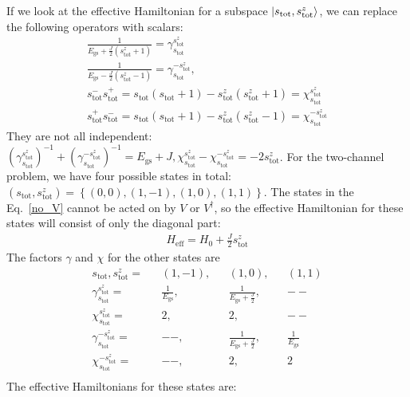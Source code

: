 \documentclass[12pt]{revtex4-2}
\begin{document}
If we look at the effective Hamiltonian for a subspace \(\ket{s_\text{tot}, s^z_\text{tot}}\), we can replace the following operators with scalars:
\begin{gather}
	\frac{1}{E_\text{gs} + \frac{J}{2} \left(s_\text{tot}^z + 1\right)} = \gamma_{s_\text{tot}}^{s_\text{tot}^z}\\
	\frac{1}{E_\text{gs} - \frac{J}{2} \left(s_\text{tot}^z - 1\right)} = \gamma_{s_\text{tot}}^{-s_\text{tot}^z},\\
	s_\text{tot}^- s_\text{tot}^+ = s_\text{tot}\left(s_\text{tot} + 1\right) - s^z_\text{tot}\left(s^z_\text{tot} + 1\right) = \chi_{s_\text{tot}}^{s_\text{tot}^z}\\
	s_\text{tot}^+ s_\text{tot}^- = s_\text{tot}\left(s_\text{tot} + 1\right) - s^z_\text{tot}\left(s^z_\text{tot} - 1\right) = \chi_{s_\text{tot}}^{-s_\text{tot}^z}
\end{gather}
They are not all independent: \(\left(\gamma_{s_\text{tot}}^{s_\text{tot}^z}\right)^{-1} + \left(\gamma_{s_\text{tot}}^{-s_\text{tot}^z}\right)^{-1} =  E_\text{gs} + J, \chi_{s_\text{tot}}^{s_\text{tot}^z} - \chi_{s_\text{tot}}^{-s_\text{tot}^z} = -2 s^z_\text{tot}\). 
For the two-channel problem, we have four possible states in total: \(\left( s_\text{tot}, s_\text{tot}^z \right) = \left\{ (0,0), (1,-1), (1,0), (1,1) \right\} \). The states in the Eq.~\ref{no_V} cannot be acted on by \(V\) or \(V^\dagger\), so the effective Hamiltonian for these states will consist of only the diagonal part:
\begin{align}
	H_\text{eff} = H_0 + \frac{J}{2}s^z_\text{tot}
\end{align}
The factors \(\gamma\) and \(\chi\) for the other states are
\begin{align}
	s_\text{tot}, s_\text{tot}^z = && (1,-1), && (1,0), && (1,1)\\
	\gamma_{s_\text{tot}}^{s_\text{tot}^z} = && \frac{1}{E_\text{gs}}, && \frac{1}{E_\text{gs} + \frac{J}{2}}, && -- \\
	\chi_{s_\text{tot}}^{s_\text{tot}^z} = && 2, && 2, && --\\
	\gamma_{s_\text{tot}}^{-s_\text{tot}^z} = && --, && \frac{1}{E_\text{gs} + \frac{J}{2}}, && \frac{1}{E_\text{gs}}\\
	\chi_{s_\text{tot}}^{-s_\text{tot}^z} = && --, && 2, && 2\\
\end{align}
The effective Hamiltonians for these states are:
\end{document}
